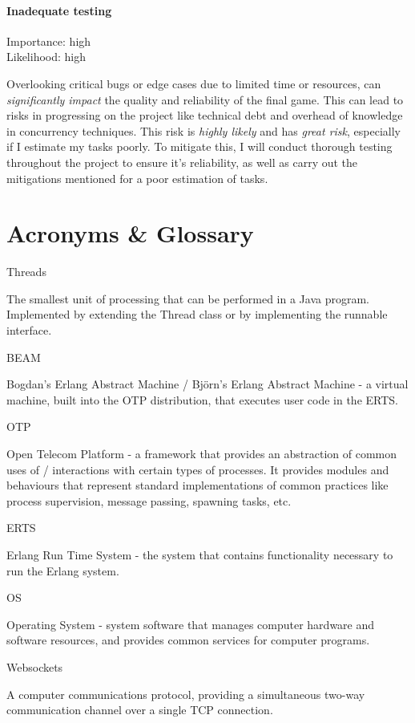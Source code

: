 \documentclass[]{plan}
\begin{document}
\subsubsection{Inadequate testing}
Importance: high\\
Likelihood: high

Overlooking critical bugs or edge cases due to limited time or resources, can \textit{significantly impact} the quality
and reliability of the final game. This can lead to risks in progressing on the project like technical debt
and overhead of knowledge in concurrency techniques. This risk is \textit{highly likely} and has \textit{great risk}, especially
if I estimate my tasks poorly. To mitigate this, I will conduct thorough testing throughout
the project to ensure it's reliability, as well as carry out the mitigations mentioned for a poor estimation
of tasks.


\chapter{Acronyms \& Glossary}

Threads

The smallest unit of processing that can be performed in a Java program. Implemented by extending the
Thread class or by implementing the runnable interface.

BEAM

Bogdan's Erlang Abstract Machine / Björn's Erlang Abstract Machine - a virtual machine, built into the OTP
distribution, that executes user code in the ERTS.

OTP

Open Telecom Platform - a framework that provides an abstraction of common uses of / interactions with
certain types of processes. It provides modules and behaviours that represent standard implementations of
common practices like process supervision, message passing, spawning tasks, etc.

ERTS

Erlang Run Time System - the system that contains functionality necessary to run the Erlang system.

OS

Operating System - system software that manages computer hardware and software resources, and
provides common services for computer programs.

Websockets

A computer communications protocol, providing a simultaneous two-way communication channel
over a single TCP connection.
\end{document}
